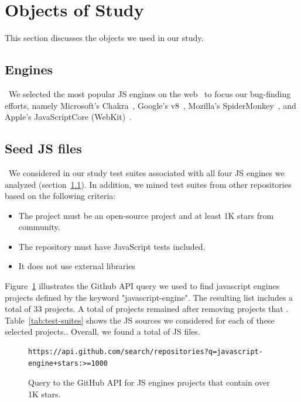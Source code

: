 \documentclass[10pt,conference,anonymous]{IEEEtran}
\begin{document}
\section{Objects of Study}
\label{sec:methodology}

This section discusses the objects we used in our study.

\subsection{Engines}
\label{sec:methodology:engines}~We selected the most popular JS
engines on the web~ to focus our bug-finding efforts, namely
Microsoft's Chakra~\cite{chakra2018repo}, Google's
v8~\cite{v82018repo}, Mozilla's
SpiderMonkey~\cite{spidermonkey2018repo}, and Apple's JavaScriptCore
(WebKit)~\cite{jsc2018repo}.

\subsection{Seed JS files\label{sec:seeds}}~We considered in our study test suites
associated with all four JS engines we analyzed
(section~\ref{sec:methodology:engines}). In addition, we mined test
suites from other repositories based on the following criteria:
\begin{itemize}
  \item The project must be an open-source project and at least 1K stars from community.
  \item The repository must have JavaScript tests included.
  \item It does not use external libraries 
\end{itemize}

Figure~\ref{fig:query} illustrates the Github API query we
used to find javascript engines projects defined by the keyword "javascript-engine". 
The resulting list includes a total of 33 projects.
A total of   projects remained after
removing projects that . Table~\ref{tab:test-suites} shows
the JS sources we considered for each of these selected
projects.. Overall, we found a total of \totfiles{} JS
files.

\begin{figure}[h]
  \centering
  \begin{lstlisting}
https://api.github.com/search/repositories?q=javascript-engine+stars:>=1000
  \end{lstlisting}
  \caption{\label{fig:query}
  Query to the GitHub API for JS engines projects that contain over 1K stars.
  }
\end{figure}
\end{document}
